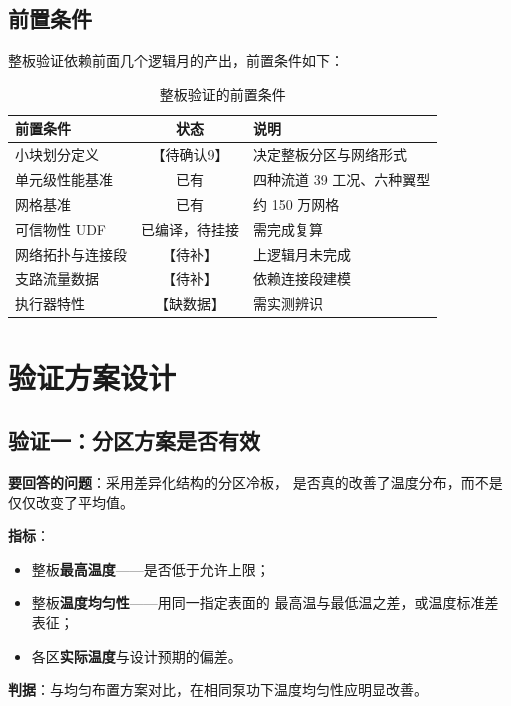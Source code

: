 \documentclass[stage2,fontset=fandol]{ydzjreport}
\begin{document}
\subsection{前置条件}

整板验证依赖前面几个逻辑月的产出，前置条件如下：

\begin{table}[H]
\centering
\caption{整板验证的前置条件}
\label{tab:pre}
\begin{tabularx}{\textwidth}{@{}Y c Y@{}}
\toprule
{} 前置条件 & 状态 & 说明 \\
\midrule
小块划分定义 & 【待确认9】 & 决定整板分区与网络形式 \\
单元级性能基准 & 已有 & 四种流道 39 工况、六种翼型 \\
网格基准 & 已有 & 约 150 万网格 \\
可信物性 UDF & 已编译，待挂接 & 需完成复算 \\
网络拓扑与连接段 & 【待补】 & 上逻辑月未完成 \\
支路流量数据 & 【待补】 & 依赖连接段建模 \\
执行器特性 & 【缺数据】 & 需实测辨识 \\
\bottomrule
\end{tabularx}
\end{table}

\section{验证方案设计}

\subsection{验证一：分区方案是否有效}

\textbf{要回答的问题}：采用差异化结构的分区冷板，
是否真的改善了温度分布，而不是仅仅改变了平均值。

\textbf{指标}：
\begin{itemize}
  \item 整板\textbf{最高温度}——是否低于允许上限；
  \item 整板\textbf{温度均匀性}——用同一指定表面的
        最高温与最低温之差，或温度标准差表征；
  \item 各区\textbf{实际温度}与设计预期的偏差。
\end{itemize}

\textbf{判据}：与均匀布置方案对比，在相同泵功下温度均匀性应明显改善。
\end{document}
